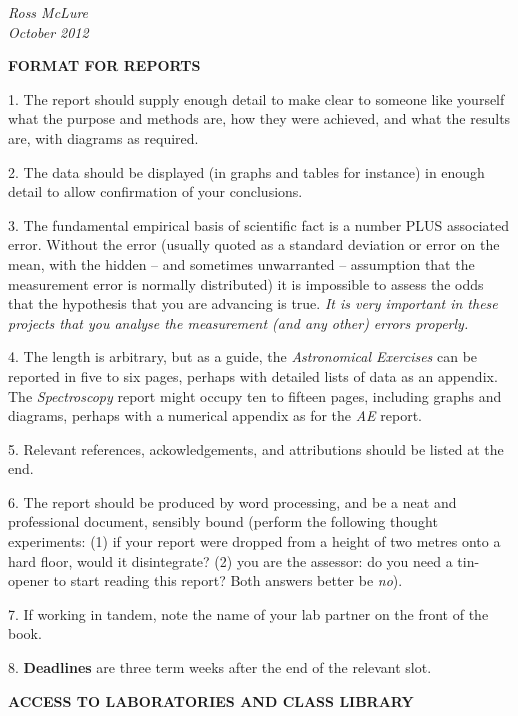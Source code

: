 \documentclass[12pt]{article}
\begin{document}
\vspace*{2mm}
{\sl Ross McLure\\
October 2012}



\newpage

\begin{center}
{\bf FORMAT FOR REPORTS}
\end{center}

1. The report should supply enough detail to make clear to someone like
yourself what the purpose and methods are, how they were achieved, and
what the results are, with diagrams as required. 

2. The data
should be displayed (in graphs and tables for instance) in enough detail to
allow confirmation of your conclusions.

3. The fundamental empirical basis of scientific fact is a number PLUS
associated error. Without the error (usually quoted as a standard deviation
or error on the mean, with the hidden -- and sometimes unwarranted -- assumption that the measurement
error is normally distributed) it is impossible to assess the odds that the 
hypothesis that you are advancing is true. {\sl It is very important in these
projects that you analyse the measurement (and any other) errors properly.}

4. The length is arbitrary, but as a guide, the {\sl Astronomical Exercises} 
can be reported in five to six pages, perhaps with detailed lists of data as 
an appendix. The {\sl Spectroscopy} report might occupy ten to fifteen pages, 
including graphs and diagrams, perhaps with a numerical appendix as for the 
{\sl AE} report.

5. Relevant references, ackowledgements, and attributions should be listed
at the end.

6. The report should be produced by word processing, and be a neat and
professional document, sensibly bound (perform the following thought 
experiments: (1) if your report were dropped from a height of two metres onto a
hard floor, would it disintegrate? (2) you are the assessor: do you need a
tin-opener to start reading this report? Both answers better be {\sl no}).

7. If working in tandem, note the name of your lab partner on the front of 
the book.

8. {\bf Deadlines} are three term weeks after the end of the relevant slot.

\bigskip 

\noindent
{\bf ACCESS TO LABORATORIES AND CLASS LIBRARY}
\vspace*{0.3cm}
\end{document}
